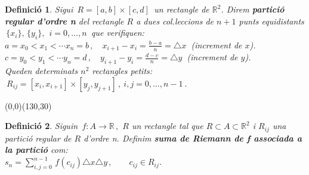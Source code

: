 \documentclass[12pt]{article}
\newtheorem{definicio}{Definici{\'o}}[subsection]
\newcommand{\R}{\mathbb{R}}
\begin{document}
\begin{definicio}
Sigui $\, R=[a,b]\times[c,d]\,$ un rectangle de $\R^2$. Direm
\textbf{partici{\'o} regular d'ordre n} del rectangle $R$ a dues
col.leccions de $n+1$ punts equidistants $\,\{x_i\}, \, \{y_i\}, \ \
i=0,\ldots
,n\,$ que verifiquen:\\

\hspace{3cm}$a=x_0<x_1<\cdots x_n=b\,,\quad
x_{i+1}-x_i=\frac{b-a}{n}=\triangle x\ $ (increment de $x$).\\

\hspace{3cm}$c=y_0<y_1<\cdots y_n=d\,,\quad
y_{i+1}-y_i=\frac{d-c}{n}=\triangle y\ $ (increment de $y$).\\

Queden determinats $n^2$ rectangles petits: $\
R_{ij}=[x_i,x_{i+1}]\times[y_j,y_{j+1}]\,,\ i,j=0,\ldots,n-1\,$.
\end{definicio}

\vspace*{4cm}
\begin{center}
\begin{picture}(0,0)(130,30)
\end{picture}
\end{center}

\vspace*{2cm}

\begin{definicio}
Siguin $\, f:A\to \R\,,$  $R$ un rectangle tal que $R\subset
A\subset\R^2$ i $R_{ij}$ una partici{\'o} regular de $R$ d'ordre n.
Definim \textbf{suma de Riemann de f associada a la partici{\'o}} com:\\

\hspace{3cm}$s_n=\displaystyle \sum\limits_{i,j=0}^{n-1}\, f(c_{ij})
\triangle x\triangle y\,,\qquad c_{ij}\in R_{ij}$. \\
\end{definicio}
\end{document}
